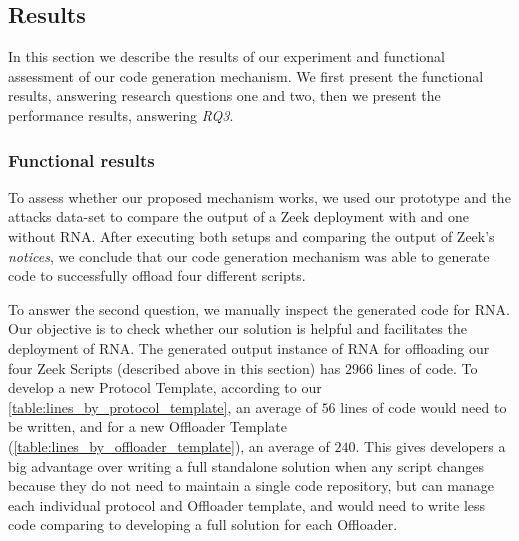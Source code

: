 



\subsection{Results}

In this section we describe the results of our experiment and functional assessment of our code generation mechanism. We first present the functional results, answering research questions one and two, then we present the performance results, answering \textit{RQ3}.

\subsubsection*{Functional results}

To assess whether our proposed mechanism works, we used our prototype and the attacks data-set to compare the output of a Zeek deployment with and one without RNA. After executing both setups and comparing the output of Zeek's \textit{notices}, we conclude that our code generation mechanism was able to generate code to successfully offload four different scripts.

To answer the second question, we manually inspect the generated code for RNA. Our objective is to check whether our solution is helpful and facilitates the deployment of RNA. The generated output instance of RNA for offloading our four Zeek Scripts (described above in this section) has $2966$ lines of code. To develop a new Protocol Template, according to our \autoref{table:lines_by_protocol_template}, an average of $56$ lines of code would need to be written, and for a new Offloader Template (\autoref{table:lines_by_offloader_template}), an average of $240$. This gives developers a big advantage over writing a full standalone solution when any script changes because they do not need to maintain a single code repository, but can manage each individual protocol and Offloader template, and would need to write less code comparing to developing a full solution for each Offloader.

